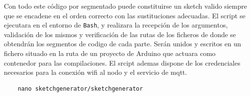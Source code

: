 Con todo este código por segmentado puede constituirse un \gls{sketch} valido siempre que se encadene en el orden correcto con las sustituciones adecuadas. El script se ejecutara en el entorno de \verb|Bash|, y realizara la recepción de los argumentos, validación de los mismos y verificación de las rutas de los ficheros de donde se obtendrán los segmentos de codigo de cada parte. Serán unidos y escritos en un fichero situado en la ruta de un proyecto de Arduino que actuara como contenedor para las compilaciones. El srcipt ademas dispone de los credenciales necesarios para la conexión \gls{wifi} al nodo y el servicio de \gls{mqtt}.

\begin{verbatim}
    nano sketchgenerator/sketchgenerator
\end{verbatim}

